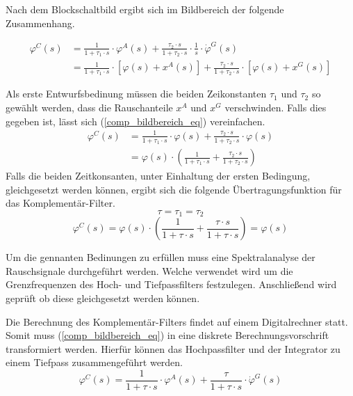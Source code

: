 Nach dem Blockschaltbild ergibt sich im Bildbereich der folgende Zusammenhang.

\begin{equation}
\label{comp_bildbereich_eq}
\begin{split}
\varphi^C(s) &= \frac{1}{1 + \tau_1 \cdot s} \cdot \varphi^A(s) + \frac{\tau_2 \cdot s}{1 + \tau_2 \cdot s} \cdot \frac{1}{s} \cdot \dot{\varphi}^G(s) \\
&= \frac{1}{1 + \tau_1 \cdot s} \cdot [\varphi(s) + x^A(s)] + \frac{\tau_2 \cdot s}{1 + \tau_2 \cdot s} \cdot [\varphi(s) + x^G(s)]
\end{split}
\end{equation}

Als erste Entwurfsbedinung müssen die beiden Zeikonstanten $\tau_1$ und $\tau_2$ so gewählt werden, dass die Rauschanteile $x^A$ und $x^G$ verschwinden. Falls dies gegeben ist, lässt sich (\ref{comp_bildbereich_eq}) vereinfachen.
\begin{equation}
\begin{split}
\varphi^C(s) &= \frac{1}{1 + \tau_1 \cdot s} \cdot \varphi(s) + \frac{\tau_2 \cdot s}{1 + \tau_2 \cdot s} \cdot \varphi(s) \\
&= \varphi(s) \cdot (\frac{1}{1 + \tau_1 \cdot s} + \frac{\tau_2 \cdot s}{1 + \tau_2 \cdot s})
\end{split}
\end{equation}
Falls die beiden Zeitkonsanten, unter Einhaltung der ersten Bedingung, gleichgesetzt werden können, ergibt sich die folgende Übertragungsfunktion für das Komplementär-Filter.
\begin{equation}
\tau = \tau_1 = \tau_2
\end{equation}
\begin{equation}
\varphi^C(s) = \varphi(s) \cdot (\frac{1}{1 + \tau \cdot s} + \frac{\tau \cdot s}{1 + \tau \cdot s}) = \varphi(s)
\end{equation}

Um die gennanten Bedinungen zu erfüllen muss eine Spektralanalyse der Rauschsignale durchgeführt werden. Welche verwendet wird um die Grenzfrequenzen des Hoch- und Tiefpassfilters festzulegen. Anschließend wird geprüft ob diese gleichgesetzt werden können.

Die Berechnung des Komplementär-Filters findet auf einem Digitalrechner statt. Somit muss (\ref{comp_bildbereich_eq}) in eine diskrete Berechnungsvorschrift transformiert werden. Hierfür können das Hochpassfilter und der Integrator zu einem Tiefpass zusammengeführt werden.
\begin{equation}
\label{Comp_Bild_eq}
\varphi^C(s) = \frac{1}{1 + \tau \cdot s} \cdot \varphi^A(s) + \frac{\tau}{1 + \tau \cdot s} \cdot \dot{\varphi}^G(s)
\end{equation}

